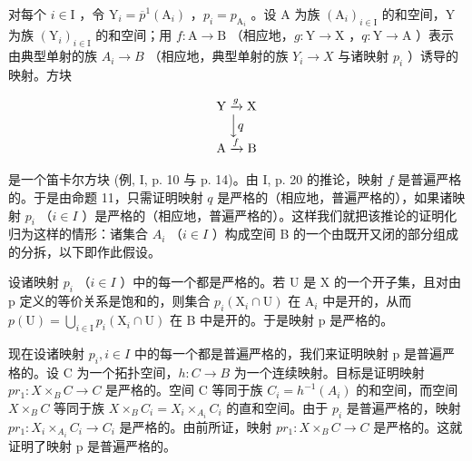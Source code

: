 对每个 \(i \in \mathrm{I}\) ，令 \(\mathrm{Y}_i = \overline{p}^{1}(\mathrm{A}_i)\) ，\(p_i = p_{\mathrm{A}_i}\) 。设 A 为族 \((\mathrm{A}_i)_{i \in \mathrm{I}}\) 的和空间，Y 为族 \((\mathrm{Y}_i)_{i \in \mathrm{I}}\) 的和空间；用 \(f: \mathrm{A} \to \mathrm{B}\) （相应地，\(g: \mathrm{Y} \to \mathrm{X}\) ，\(q: \mathrm{Y} \to \mathrm{A}\) ）表示由典型单射的族 \(A_i \rightarrow B\) （相应地，典型单射的族 \(Y_i \rightarrow X\) 与诸映射 \(p_i\) ）诱导的映射。方块

\[
\begin{array}{c} \mathrm{Y} \xrightarrow {g} \mathrm{X} \\ \Big \downarrow q \\ \mathrm{A} \xrightarrow {f} \mathrm{B} \end{array}
\]

是一个笛卡尔方块 (例, I, p. 10 与 p. 14)。由 I, p. 20 的推论，映射 \(f\) 是普遍严格的。于是由命题 11，只需证明映射 \(q\) 是严格的（相应地，普遍严格的），如果诸映射 \(p_i\) （\(i \in I\) ）是严格的（相应地，普遍严格的）。这样我们就把该推论的证明化归为这样的情形：诸集合 \(A_i\) （\(i \in I\) ）构成空间 B 的一个由既开又闭的部分组成的分拆，以下即作此假设。

设诸映射 \(p_i\) （\(i \in I\) ）中的每一个都是严格的。若 U 是 X 的一个开子集，且对由 p 定义的等价关系是饱和的，则集合 \(p_i(\mathrm{X}_i \cap \mathrm{U})\) 在 \(\mathrm{A}_i\) 中是开的，从而 \(p(\mathrm{U}) = \bigcup_{i \in \mathrm{I}} p_i(\mathrm{X}_i \cap \mathrm{U})\) 在 B 中是开的。于是映射 p 是严格的。

现在设诸映射 \(p_{i}, i \in I\) 中的每一个都是普遍严格的，我们来证明映射 p 是普遍严格的。设 C 为一个拓扑空间，\(h: C \to B\) 为一个连续映射。目标是证明映射 \(pr_{1}: X \times_{B} C \to C\) 是严格的。空间 C 等同于族 \(C_{i} = h^{-1}(A_{i})\) 的和空间，而空间 \(X \times_{B} C\) 等同于族 \(X \times_{B} C_{i} = X_{i} \times_{A_{i}} C_{i}\) 的直和空间。由于 \(p_{i}\) 是普遍严格的，映射 \(pr_{1}: X_{i} \times_{A_{i}} C_{i} \to C_{i}\) 是严格的。由前所证，映射 \(pr_{1}: X \times_{B} C \to C\) 是严格的。这就证明了映射 p 是普遍严格的。

